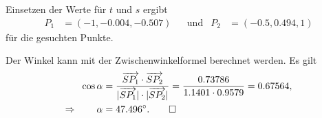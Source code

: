 \begin{loesung}
\begin{teilaufgaben}
Einsetzen der Werte für $t$ und $s$ ergibt
\[
\begin{aligned}
P_1&=(-1, -0.004, -0.507)
&&\text{und}&
P_2&=(-0.5,0.494, 1)
\end{aligned}
\]
für die gesuchten Punkte.
\item
Der Winkel kann mit der Zwischenwinkelformel berechnet werden.
Es gilt
\begin{align*}
\cos\alpha
&=
\frac{\overrightarrow{SP_1}\cdot\overrightarrow{SP_2}}{|\overrightarrow{SP_1}|\cdot|\overrightarrow{SP_2}|}
=
\frac{0.73786}{1.1401\cdot 0.9579} = 0.67564,
\\
\Rightarrow\qquad
\alpha
&=
47.496^\circ.
\qedhere
\end{align*}
\end{teilaufgaben}
\end{loesung}

